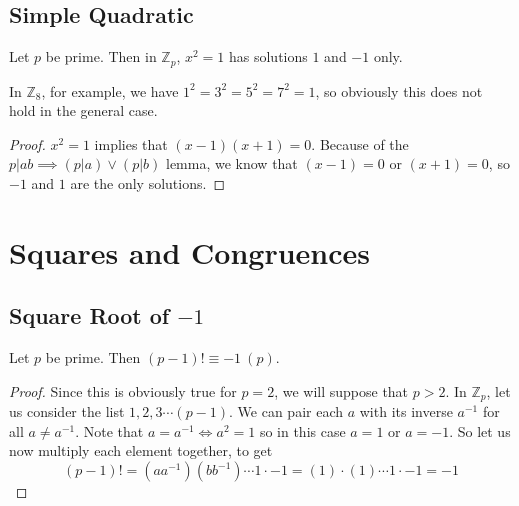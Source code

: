 \documentclass{article}
\begin{document}
	\subsection{Simple Quadratic}
	\begin{lemma}
		Let $p$ be prime. Then in $\mathbb Z_p$, $x^2 = 1$ has solutions $1$ and $-1$ only.
	\end{lemma}
	\begin{note}
		In $\mathbb Z_8$, for example, we have $1^2 = 3^2 = 5^2 = 7^2 = 1$, so obviously this does not hold in the general case.
	\end{note}
	\begin{proof}
		$x^2 = 1$ implies that $(x-1)(x+1) = 0$. Because of the $p|ab\implies (p|a) \vee (p|b)$ lemma, we know that $(x-1) = 0$ or $(x+1) = 0$, so $-1$ and $1$ are the only solutions.
	\end{proof}

	\section{Squares and Congruences}
	\subsection{Square Root of $-1$}
	\begin{theorem}
		Let $p$ be prime. Then $(p-1)! \equiv -1\ (p)$.
	\end{theorem}
	\begin{proof}
		Since this is obviously true for $p=2$, we will suppose that $p>2$. In $\mathbb Z_p$, let us consider the list $1, 2, 3 \cdots (p-1)$. We can pair each $a$ with its inverse $a^{-1}$ for all $a \neq a^{-1}$. Note that $a = a^{-1} \iff a^2 = 1$ so in this case $a=1$ or $a=-1$. So let us now multiply each element together, to get
		\[ (p-1)! = (aa^{-1}) (bb^{-1}) \cdots 1 \cdot -1 = (1) \cdot (1) \cdots 1 \cdot -1 = -1 \]
	\end{proof}
\end{document}
